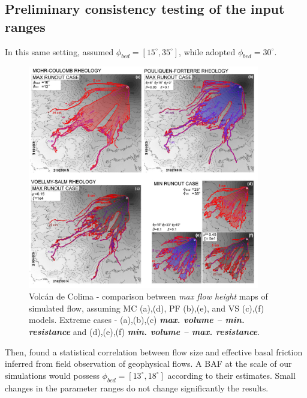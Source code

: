 \documentclass{article}
\begin{document}
\subsection{Preliminary consistency testing of the input ranges}
In this same setting, \cite{Dalbey2008} assumed $\phi_{bed}=[15^\mathrm{\circ}, 35^\mathrm{\circ}]$, while \cite{Capra2011} adopted $\phi_{bed}=30^\mathrm{\circ}$.
\begin{figure}[H]
         \centering
        \includegraphics[width=0.90\textwidth]{figures/Colima/ExtremeMaps.jpg}
        \caption{Volc\'an de Colima - comparison between \emph{max flow height} maps of simulated flow, assuming MC (a),(d), PF (b),(e), and VS (c),(f) models. Extreme cases - (a),(b),(c) \emph{\textbf{max. volume -- min. resistance}} and (d),(e),(f) \emph{\textbf{min. volume -- max. resistance}}.}
        \label{Colima-MaxMinExtents}
\end{figure}
Then, \cite{Spiller2014,Bayarri2015,Ogburn2016} found a statistical correlation between flow size and effective basal friction inferred from field observation of geophysical flows. A BAF at the scale of our simulations would possess $\phi_{bed}=[13^\mathrm{\circ}, 18^\mathrm{\circ}]$ according to their estimates. Small changes in the parameter ranges do not change significantly the results.
\end{document}
